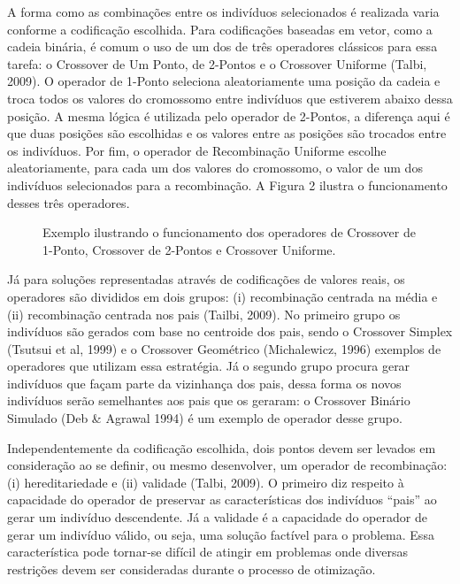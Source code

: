 A forma como as combinações entre os indivíduos selecionados é realizada varia conforme a codificação escolhida. Para codificações baseadas em vetor, como a cadeia binária, é comum o uso de um dos de três operadores clássicos para essa tarefa: o Crossover de Um Ponto, de 2-Pontos e o Crossover Uniforme (Talbi, 2009). O operador de 1-Ponto seleciona aleatoriamente uma posição da cadeia e troca todos os valores do cromossomo entre indivíduos que estiverem abaixo dessa posição.  A mesma lógica é utilizada pelo operador de 2-Pontos, a diferença aqui é que duas posições são escolhidas e os valores entre as posições são trocados entre os indivíduos. Por fim, o operador de Recombinação Uniforme escolhe aleatoriamente, para cada um dos valores do cromossomo, o valor de um dos indivíduos selecionados para a recombinação. A Figura 2 ilustra o funcionamento desses três operadores.

\begin{figure}[htb]
\centering

\caption{Exemplo ilustrando o funcionamento dos operadores de Crossover de 1-Ponto, Crossover de 2-Pontos e Crossover Uniforme.}

\end{figure}

Já para soluções representadas através de codificações de valores reais, os operadores são divididos em dois grupos: (i) recombinação centrada na média e (ii) recombinação centrada nos pais (Tailbi, 2009). No primeiro grupo os indivíduos são gerados com base no centroide dos pais, sendo o Crossover Simplex (Tsutsui et al, 1999) e o Crossover Geométrico (Michalewicz, 1996) exemplos de operadores que utilizam essa estratégia. Já o segundo grupo procura gerar indivíduos que façam parte da vizinhança dos pais, dessa forma os novos indivíduos serão semelhantes aos pais que os geraram: o Crossover Binário Simulado (Deb \& Agrawal 1994) é um exemplo de operador desse grupo.   

Independentemente da codificação escolhida, dois pontos devem ser levados em consideração ao se definir, ou mesmo desenvolver, um operador de recombinação: (i) hereditariedade e (ii) validade (Talbi, 2009). O primeiro diz respeito à capacidade do operador de preservar as características dos indivíduos “pais” ao gerar um indivíduo descendente. Já a validade é a capacidade do operador de gerar um indivíduo válido, ou seja, uma solução factível para o problema. Essa característica pode tornar-se difícil de atingir em problemas onde diversas restrições devem ser consideradas durante o processo de otimização.


